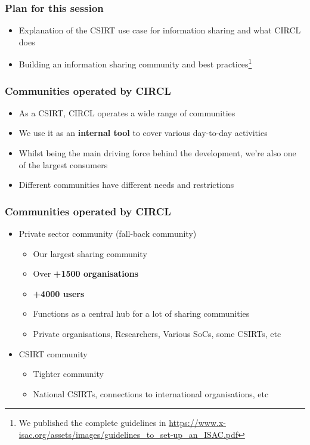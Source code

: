 
\begin{frame}[t,plain]
\titlepage
\end{frame}

\begin{frame}
	\frametitle{Plan for this session}
	\begin{itemize}
		\item Explanation of the CSIRT use case for information sharing and what CIRCL does
        \item Building an information sharing community and best practices\footnote{We published the complete guidelines in \url{https://www.x-isac.org/assets/images/guidelines_to_set-up_an_ISAC.pdf}}
	\end{itemize}
\end{frame}

\begin{frame}
\frametitle{Communities operated by CIRCL}
\begin{itemize}
        \item As a CSIRT, CIRCL operates a wide range of communities
        \item We use it as an {\bf internal tool} to cover various day-to-day activities
        \item Whilst being the main driving force behind the development, we're also one of the largest consumers
	\item Different communities have different needs and restrictions
\end{itemize}
\end{frame}

\begin{frame}
\frametitle{Communities operated by CIRCL}
\begin{itemize}
    \item Private sector community (fall-back community)
	\begin{itemize}
		\item Our largest sharing community
		\item Over {\bf +1500 organisations}
		\item {\bf +4000 users}
		\item Functions as a central hub for a lot of sharing communities
		\item Private organisations, Researchers, Various SoCs, some CSIRTs, etc
	\end{itemize}
	\item CSIRT community
	\begin{itemize}
		\item Tighter community
		\item National CSIRTs, connections to international organisations, etc
	\end{itemize}
\end{itemize}
\end{frame}

